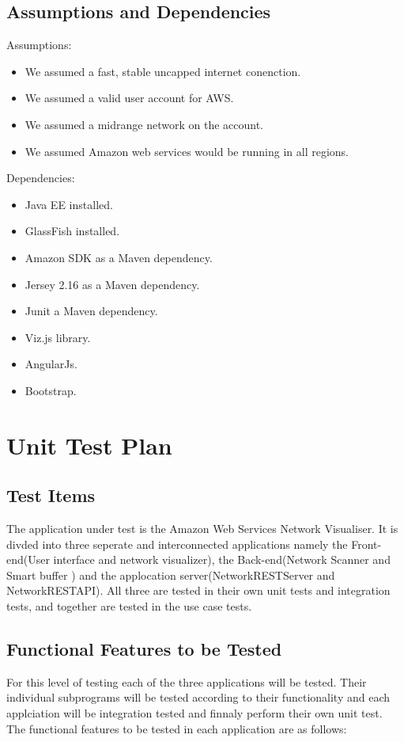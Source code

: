 \documentclass[hidelinks,a4paper,12pt]{article}
\begin{document}
\subsection{Assumptions and Dependencies}
Assumptions:
\begin{itemize}
  \item We assumed a fast, stable uncapped internet conenction.
  \item We assumed a valid user account for AWS.
\item We assumed a midrange network on the account.
\item We assumed Amazon web services would be running in all regions.
\end{itemize}
Dependencies:
\begin{itemize}
  \item Java EE installed.
  \item GlassFish installed.
\item Amazon SDK as a Maven dependency.
\item Jersey 2.16 as a Maven dependency.
\item Junit a Maven dependency.
\item Viz.js library.
\item AngularJs.
\item Bootstrap.
\end{itemize}
\newpage
\section{Unit Test Plan}

\subsection{Test Items}
The application under test is the Amazon Web Services Network Visualiser. It is divded into three seperate and interconnected applications namely the Front-end(User interface and network visualizer), the Back-end(Network Scanner and Smart buffer ) and the applocation server(NetworkRESTServer and NetworkRESTAPI). All three are tested in their own unit tests and integration tests, and together are tested in the use case tests.
 
\subsection{Functional Features to be Tested}  
For this level of testing each of the three applications will be tested. Their individual subprograms will be tested according to their functionality and each applciation will be integration tested and finnaly perform their own unit test. The functional features to be tested in each application are as follows:
\end{document}
